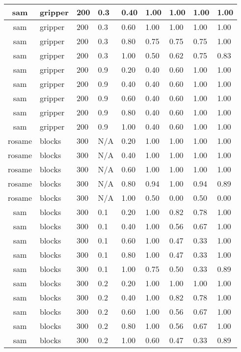 \begin{table}[ht]
\begin{tabular}{c}
sam & gripper & 200 & 0.3 & 0.40 & 1.00 & 1.00 & 1.00 & 1.00 \\ \hline
sam & gripper & 200 & 0.3 & 0.60 & 1.00 & 1.00 & 1.00 & 1.00 \\ \hline
sam & gripper & 200 & 0.3 & 0.80 & 0.75 & 0.75 & 0.75 & 1.00 \\ \hline
sam & gripper & 200 & 0.3 & 1.00 & 0.50 & 0.62 & 0.75 & 0.83 \\ \hline
sam & gripper & 200 & 0.9 & 0.20 & 0.40 & 0.60 & 1.00 & 1.00 \\ \hline
sam & gripper & 200 & 0.9 & 0.40 & 0.40 & 0.60 & 1.00 & 1.00 \\ \hline
sam & gripper & 200 & 0.9 & 0.60 & 0.40 & 0.60 & 1.00 & 1.00 \\ \hline
sam & gripper & 200 & 0.9 & 0.80 & 0.40 & 0.60 & 1.00 & 1.00 \\ \hline
sam & gripper & 200 & 0.9 & 1.00 & 0.40 & 0.60 & 1.00 & 1.00 \\ \hline
rosame & blocks & 300 & N/A & 0.20 & 1.00 & 1.00 & 1.00 & 1.00 \\ \hline
rosame & blocks & 300 & N/A & 0.40 & 1.00 & 1.00 & 1.00 & 1.00 \\ \hline
rosame & blocks & 300 & N/A & 0.60 & 1.00 & 1.00 & 1.00 & 1.00 \\ \hline
rosame & blocks & 300 & N/A & 0.80 & 0.94 & 1.00 & 0.94 & 0.89 \\ \hline
rosame & blocks & 300 & N/A & 1.00 & 0.50 & 0.00 & 0.50 & 0.00 \\ \hline
sam & blocks & 300 & 0.1 & 0.20 & 1.00 & 0.82 & 0.78 & 1.00 \\ \hline
sam & blocks & 300 & 0.1 & 0.40 & 1.00 & 0.56 & 0.67 & 1.00 \\ \hline
sam & blocks & 300 & 0.1 & 0.60 & 1.00 & 0.47 & 0.33 & 1.00 \\ \hline
sam & blocks & 300 & 0.1 & 0.80 & 1.00 & 0.47 & 0.33 & 1.00 \\ \hline
sam & blocks & 300 & 0.1 & 1.00 & 0.75 & 0.50 & 0.33 & 0.89 \\ \hline
sam & blocks & 300 & 0.2 & 0.20 & 1.00 & 1.00 & 1.00 & 1.00 \\ \hline
sam & blocks & 300 & 0.2 & 0.40 & 1.00 & 0.82 & 0.78 & 1.00 \\ \hline
sam & blocks & 300 & 0.2 & 0.60 & 1.00 & 0.56 & 0.67 & 1.00 \\ \hline
sam & blocks & 300 & 0.2 & 0.80 & 1.00 & 0.56 & 0.67 & 1.00 \\ \hline
sam & blocks & 300 & 0.2 & 1.00 & 0.60 & 0.47 & 0.33 & 0.89 \\ \hline

\end{tabular}
\end{table}
